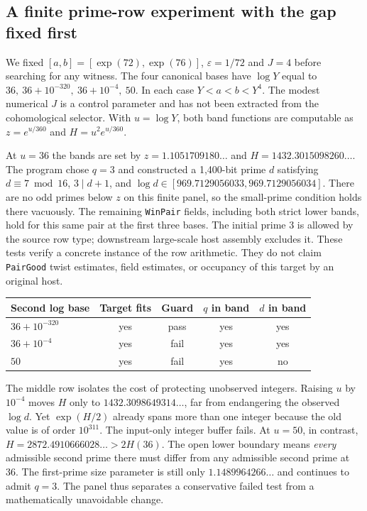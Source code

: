 \documentclass[12pt,letterpaper]{article}
\begin{document}
\subsection{A finite prime-row experiment with the gap fixed first}

We fixed \([a,b]=[\exp(72),\exp(76)]\), \(\varepsilon=1/72\) and \(J=4\) before searching for any witness. The four canonical bases have \(\log Y\) equal to \(36,\ 36+10^{-320},\ 36+10^{-4},\ 50\). In each case \(Y<a<b<Y^4\). The modest numerical \(J\) is a control parameter and has not been extracted from the cohomological selector. With \(u=\log Y\), both band functions are computable as \(z=e^{u/360}\) and \(H=u^2 e^{u/360}\).

At \(u=36\) the bands are set by \(z=1.1051709180\ldots\) and \(H=1432.3015098260\ldots\). The program chose \(q=3\) and constructed a 1,400-bit prime \(d\) satisfying \(d\equiv7\bmod16\), \(3\mid d+1\), and \(\log d\in[969.7129056033,969.7129056034]\). There are no odd primes below \(z\) on this finite panel, so the small-prime condition holds there vacuously. The remaining \texttt{WinPair} fields, including both strict lower bands, hold for this same pair at the first three bases. The initial prime \(3\) is allowed by the source row type; downstream large-scale host assembly excludes it. These tests verify a concrete instance of the row arithmetic. They do not claim \texttt{PairGood} twist estimates, field estimates, or occupancy of this target by an original host.

\begin{center}
\begin{tabular}{lcccc}
\toprule
Second log base & Target fits & Guard & \(q\) in band & \(d\) in band\\
\midrule
\(36+10^{-320}\)&yes&pass&yes&yes\\
\(36+10^{-4}\)&yes&fail&yes&yes\\
\(50\)&yes&fail&yes&no\\
\bottomrule
\end{tabular}
\end{center}

The middle row isolates the cost of protecting unobserved integers. Raising \(u\) by \(10^{-4}\) moves \(H\) only to \(1432.3098649314\ldots\), far from endangering the observed \(\log d\). Yet \(\exp(H/2)\) already spans more than one integer because the old value is of order \(10^{311}\). The input-only integer buffer fails. At \(u=50\), in contrast, \(H=2872.4910666028\ldots>2H(36)\). The open lower boundary means \emph{every} admissible second prime there must differ from any admissible second prime at 36. The first-prime size parameter is still only \(1.1489964266\ldots\) and continues to admit \(q=3\). The panel thus separates a conservative failed test from a mathematically unavoidable change.
\end{document}
